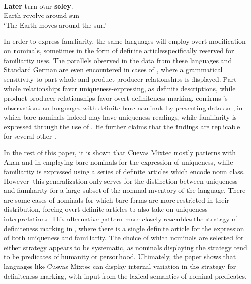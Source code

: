 \documentclass[output=paper,modfonts,nonflat]{langsci/langscibook}
\begin{document}
\begin{exe}
\ex \label{ex:cisneros:15}
 \\
\gll
\textbf{Later} turn otur \textbf{soley}.\\
Earth revolve around sun\\
\glt
`The Earth moves around the sun.'
\end{exe}

In order to express familiarity, the same languages will employ overt modification on nominals, sometimes in the form of definite articles\linebreak specifically reserved for familiarity uses.  The parallels observed in the data from these languages and Standard German are even encountered in cases of , where a grammatical sensitivity to part-whole and product-producer relationships is displayed. Part-whole relationships favor uniqueness-expressing,  as definite descriptions, while product producer relationships favor overt definiteness marking.  \citet{Jenks2015} confirms \citeauthor{Schwarz2009}'s observations on languages with definite bare nominals by presenting data on , in which bare nominals indeed may have uniqueness readings, while familiarity is expressed through the use of .  He further claims that the findings are replicable for several other .

In the rest of this paper, it is shown that Cuevas Mixtec mostly patterns with Akan and  in employing bare nominals for the expression of uniqueness, while familiarity is expressed using a series of definite articles which encode noun class.  However, this generalization only serves for the distinction between uniqueness and familiarity for a large subset of the nominal inventory of the language.  There are some cases of nominals for which bare forms are more restricted in their distribution, forcing overt definite articles to also take on uniqueness interpretations.  This alternative pattern more closely resembles the strategy of definiteness marking in , where there is a single definite article for the expression of both uniqueness and familiarity.  The choice of which nominals are selected for either strategy appears to be systematic, as nominals displaying the  strategy tend to be predicates of humanity or personhood.  Ultimately, the paper shows that languages like Cuevas Mixtec can display internal variation in the strategy for definiteness marking, with input from the lexical semantics of nominal predicates.
\end{document}
